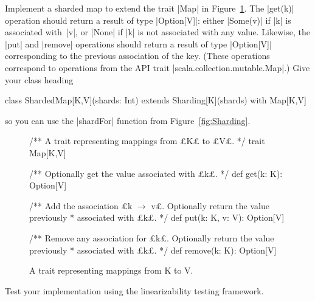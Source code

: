 \begin{questionS}
\label{ex:sharded-map}
Implement a sharded map to extend the trait |Map| in
Figure~\ref{fig:Map-trait}.  The |get(k)| operation should return a result of
type |Option[V]|: either |Some(v)| if |k| is associated with~|v|, or |None| if
|k| is not associated with any value.  Likewise, the |put| and |remove|
operations should return a result of type |Option[V]| corresponding to the
previous association of the key.  (These operations correspond to operations
from the API trait |scala.collection.mutable.Map|.)  Give your class heading
\begin{scala}
class ShardedMap[K,V](shards: Int) extends Sharding[K](shards) with Map[K,V]
\end{scala}
so you can use the |shardFor| function from Figure~\ref{fig:Sharding}.


\begin{figure}
\begin{scala}
/** A trait representing mappings from £K£ to £V£. */
trait Map[K,V]{
  /** Optionally get the value associated with £k£. */
  def get(k: K): Option[V] 

  /** Add the association £k $\rightarrow$ v£.  Optionally return the value previously
    * associated with £k£. */
  def put(k: K, v: V): Option[V] 

  /** Remove any association for £k£.  Optionally return the value previously
    * associated with £k£. */
  def remove(k: K): Option[V] 
}
\end{scala}
\caption{A trait representing mappings from {\scalashape K} to {\scalashape
    V}.}
\label{fig:Map-trait}
\end{figure}


Test your implementation using the linearizability testing framework.
\end{questionS}


